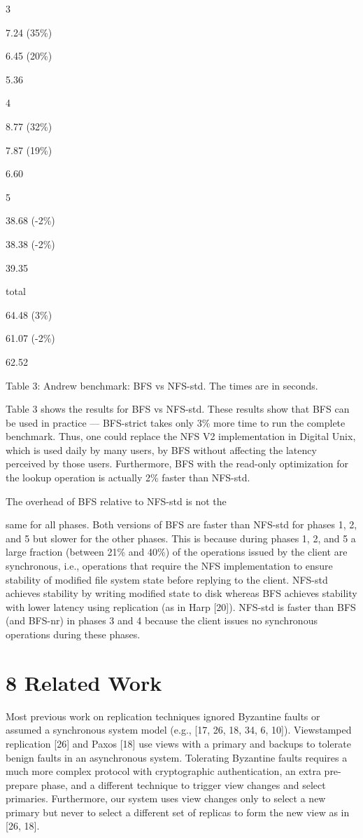\documentclass[
]{article}
\begin{document}
3

7.24 (35\%)

6.45 (20\%)

5.36

4

8.77 (32\%)

7.87 (19\%)

6.60

5

38.68 (-2\%)

38.38 (-2\%)

39.35

total

64.48 (3\%)

61.07 (-2\%)

62.52

Table 3: Andrew benchmark: BFS vs NFS-std. The times are in seconds.

Table 3 shows the results for BFS vs NFS-std. These results show that
BFS can be used in practice --- BFS-strict takes only 3\% more time to
run the complete benchmark. Thus, one could replace the NFS V2
implementation in Digital Unix, which is used daily by many users, by
BFS without affecting the latency perceived by those users. Furthermore,
BFS with the read-only optimization for the lookup operation is actually
2\% faster than NFS-std.

The overhead of BFS relative to NFS-std is not the

same for all phases. Both versions of BFS are faster than NFS-std for
phases 1, 2, and 5 but slower for the other phases. This is because
during phases 1, 2, and 5 a large fraction (between 21\% and 40\%) of
the operations issued by the client are synchronous, i.e., operations
that require the NFS implementation to ensure stability of modified file
system state before replying to the client. NFS-std achieves stability
by writing modified state to disk whereas BFS achieves stability with
lower latency using replication (as in Harp {[}20{]}). NFS-std is faster
than BFS (and BFS-nr) in phases 3 and 4 because the client issues no
synchronous operations during these phases.

\section{8 Related Work}\label{related-work}

Most previous work on replication techniques ignored Byzantine faults or
assumed a synchronous system model (e.g., {[}17, 26, 18, 34, 6, 10{]}).
Viewstamped replication {[}26{]} and Paxos {[}18{]} use views with a
primary and backups to tolerate benign faults in an asynchronous system.
Tolerating Byzantine faults requires a much more complex protocol with
cryptographic authentication, an extra pre-prepare phase, and a
different technique to trigger view changes and select primaries.
Furthermore, our system uses view changes only to select a new primary
but never to select a different set of replicas to form the new view as
in {[}26, 18{]}.
\end{document}
